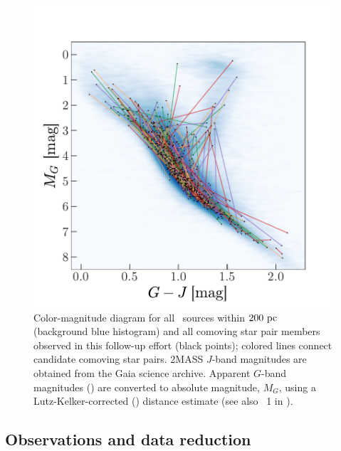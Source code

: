 \documentclass[modern, letterpaper]{aastex61}
\newcommand{\tgas}{\acronym{TGAS}}
\begin{document}
\begin{figure}[htbp]
  \begin{center}
    \includegraphics[width=\linewidth]{sample_cmd.pdf}
  \end{center}
  \caption{%
    Color-magnitude diagram for all \tgas\ sources within $200~\mathrm{pc}$ (background
    blue histogram) and all comoving star pair members observed in this
    follow-up effort (black points); colored lines connect candidate comoving
    star pairs.
    2MASS $J$-band magnitudes are obtained from the Gaia science
    archive.
    Apparent $G$-band magnitudes (\citealt{Carrasco:2016}) are converted to
    absolute magnitude, $M_G$, using a Lutz-Kelker-corrected
    (\citealt{Lutz:1973}) distance estimate (see also \eqname~1 in
    \citealt{Oh:2017}).
    \label{fig:sample-cmd}}
\end{figure}

\subsection{Observations and data reduction}\label{sec:reduction}
\end{document}
